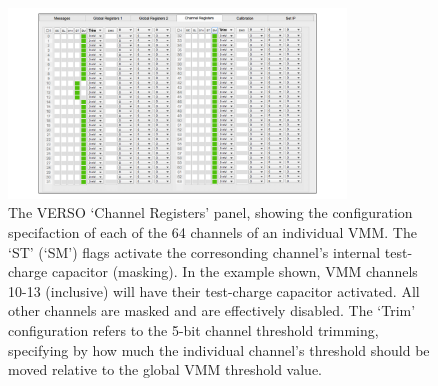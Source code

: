 \begin{figure}[!htb]
    \begin{center}
        \includegraphics[width=0.8\textwidth]{figures/nsw/vrs/verso_chanreg}
        \caption{
            The VERSO `Channel Registers' panel, showing the configuration specifaction
            of each of the 64 channels of an individual VMM.
            The `ST' (`SM') flags activate the corresonding channel's internal test-charge
            capacitor (masking).
            In the example shown, VMM channels 10-13 (inclusive) will have their
            test-charge capacitor activated. All other channels are masked and
            are effectively disabled.
            The `Trim' configuration refers to the 5-bit channel threshold trimming,
            specifying by how much the individual channel's threshold should be moved
            relative to the global VMM threshold value.
        }
        \label{fig:verso_chanreg}
    \end{center}
\end{figure}

\FloatBarrier
